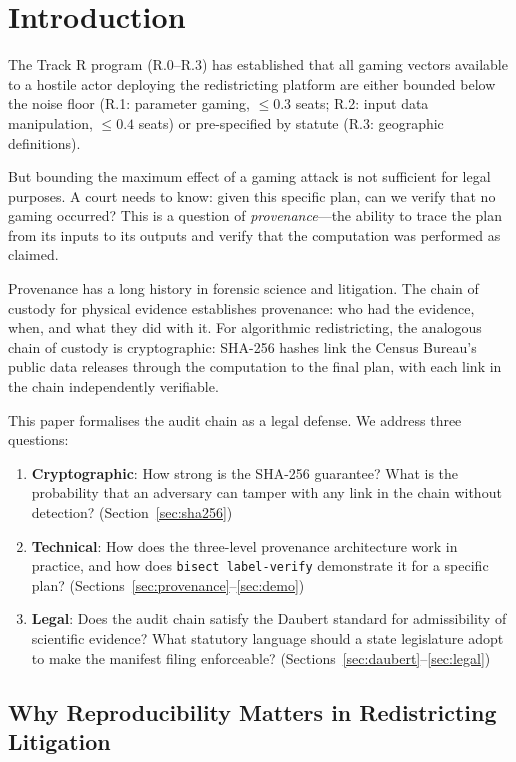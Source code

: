 \section{Introduction}
\label{sec:introduction}

The Track R program (R.0--R.3) has established that all gaming vectors
available to a hostile actor deploying the \bisect{} redistricting platform
are either bounded below the noise floor (R.1: parameter gaming, $\leq 0.3$
seats; R.2: input data manipulation, $\leq 0.4$ seats) or pre-specified
by statute (R.3: geographic definitions).

But bounding the maximum effect of a gaming attack is not sufficient
for legal purposes.
A court needs to know: given this specific plan, can we verify that no
gaming occurred?
This is a question of \emph{provenance}---the ability to trace the plan
from its inputs to its outputs and verify that the computation was performed
as claimed.

Provenance has a long history in forensic science and litigation.
The chain of custody for physical evidence establishes provenance: who
had the evidence, when, and what they did with it.
For algorithmic redistricting, the analogous chain of custody is
cryptographic: SHA-256 hashes link the Census Bureau's public data releases
through the computation to the final plan, with each link in the chain
independently verifiable.

This paper formalises the \bisect{} audit chain as a legal defense.
We address three questions:
\begin{enumerate}
\item \textbf{Cryptographic}: How strong is the SHA-256 guarantee?
  What is the probability that an adversary can tamper with any link
  in the chain without detection?
  (Section~\ref{sec:sha256})
\item \textbf{Technical}: How does the three-level provenance architecture
  work in practice, and how does \texttt{bisect label-verify} demonstrate
  it for a specific plan?
  (Sections~\ref{sec:provenance}--\ref{sec:demo})
\item \textbf{Legal}: Does the audit chain satisfy the Daubert standard
  for admissibility of scientific evidence?
  What statutory language should a state legislature adopt to make the
  manifest filing enforceable?
  (Sections~\ref{sec:daubert}--\ref{sec:legal})
\end{enumerate}

\subsection{Why Reproducibility Matters in Redistricting Litigation}

